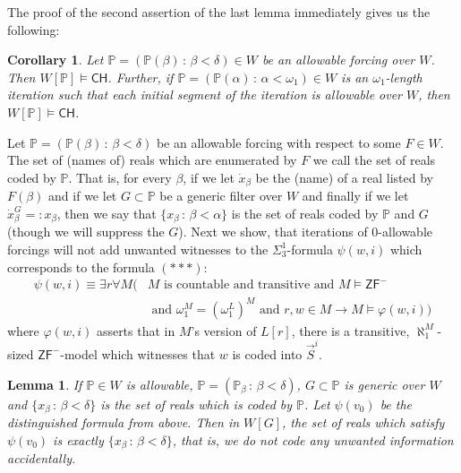 \documentclass[a4paper,11pt]{article}
\newtheorem{lemma}[theorem]{Lemma}
\newtheorem{corollary}[theorem]{Corollary}
\newcommand{\forceP}{\mathbb{P}}
\newcommand{\ZFP}{\mathsf{ZF}^-}
\newcommand{\CH}{\mathsf{CH}}
\begin{document}
The proof of the second assertion of the last lemma immediately gives us the following:
\begin{corollary}
Let $\forceP= (\forceP(\beta) \, : \, \beta < \delta) \in W$ be an allowable forcing over $W$. Then $W[\forceP] \models \CH$. Further, if $\forceP= (\forceP(\alpha) \, : \, \alpha < \omega_1) \in W$ is an $\omega_1$-length iteration such that each initial segment of the iteration is allowable over $W$, then $W[\forceP] \models \CH$.

\end{corollary}
Let $\forceP= (\forceP(\beta) \, : \, \beta < \delta)$ be an allowable forcing with respect to some $F \in W$.
The set of  (names of) reals which are enumerated by $F$ we call the set of reals coded by $\forceP$. That is, for every $\beta$, if we let $\dot{x}_{\beta}$ be the (name) of a real  listed by $F(\beta)$ and if we let $G \subset \forceP$ be a generic filter over $W$ and finally if we let
$ \dot{x}_{\beta}^G =:x_{\beta}$,  then we say that
$\{ x_{\beta} \, : \, \beta < \alpha \}$ is the set of reals coded by $\forceP$ and $G$ (though we will suppress the $G$).
Next we show, that iterations of 0-allowable forcings will not add unwanted witnesses to the $\Sigma^1_3$-formula $\psi(w,i)$ which corresponds to the formula $({\ast} {\ast} {\ast})$:
\begin{align*}
 \psi(w,i) \equiv \exists r  \forall M (&M \text{ is countable and transitive and } M \models \ZFP \\&\text{ and } \omega_1^M=(\omega_1^L)^M \text{ and }  r, w \in M  \rightarrow M \models \varphi(w,i) )
\end{align*}
where $\varphi(w,i)$ asserts that in $M$'s version of $L[r]$, there is a transitive, $\aleph_1^M$-sized $\ZFP$-model which witnesses that $w$ is coded into $\vec{S}^i$.
\begin{lemma}\label{nounwantedcodes}
If $\forceP \in W$ is allowable, $\forceP=(\forceP_{\beta} \, : \, \beta < \delta)$, $G \subset \forceP$ is generic over $W$ and $\{ x_{\beta} \, : \, \beta < \delta\}$ is the set of reals which is coded by  $\forceP$. Let $\psi(v_0)$ be the distinguished formula from above. Then
in $W[G]$, the set of reals which satisfy $\psi(v_0)$ is exactly 
$\{ x_{\beta} \, : \, \beta < \delta\}$, that is, we do not code any unwanted information accidentally.
\end{lemma}
\end{document}
